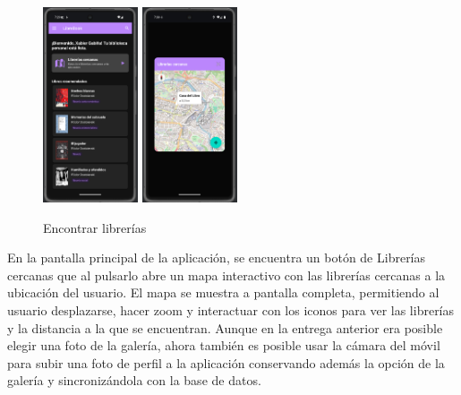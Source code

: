 \documentclass[a4paper,11pt]{report}
\begin{document}
      \begin{figure}[H]
        \centering
        \includegraphics[width=0.25\textwidth]{.img/mapa_boton.png}
        \hspace{2cm}
        \includegraphics[width=0.25\textwidth]{.img/mapa_fragment.png}
        \caption{Encontrar librerías}
        \label{fig:mapa}
      \end{figure}
      En la pantalla principal de la aplicación, se encuentra un botón de Librerías cercanas que al pulsarlo abre un mapa interactivo con las librerías cercanas a la ubicación del usuario. 
      El mapa se muestra a pantalla completa, permitiendo al usuario desplazarse, hacer zoom y interactuar con los iconos para ver las librerías y la distancia a la que se encuentran.
      Aunque en la entrega anterior era posible elegir una foto de la galería, ahora también es posible usar la cámara del móvil para subir una foto de perfil a la aplicación conservando además la opción de la galería y sincronizándola con la base de datos.
\end{document}
